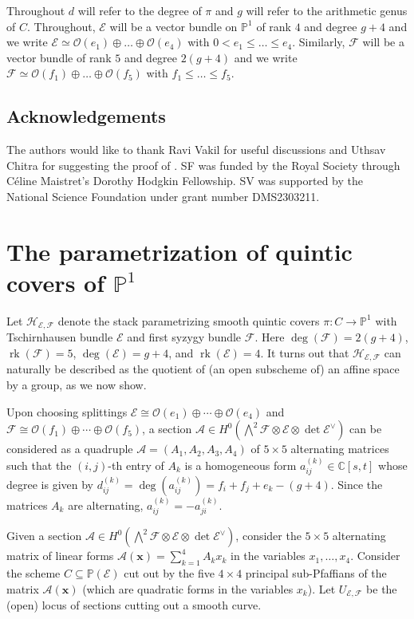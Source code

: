 \documentclass[11pt]{amsart}
\numberwithin{theorem}{section}
\numberwithin{equation}{section}
\theoremstyle{definition}\newtheorem{defn}[theorem]{Definition}
\theoremstyle{definition}\newtheorem{remark}[theorem]{Remark}
\theoremstyle{definition}\newtheorem{question}[theorem]{Question}
\theoremstyle{definition}\newtheorem{problem}[theorem]{Problem}
\newcommand{\CC}{\mathbb{C}}
\newcommand{\PP}{\mathbb{P}}
\newcommand{\cE}{\mathcal{E}}
\newcommand{\cF}{\mathcal{F}}
\newcommand{\cA}{\mathcal{A}}
\newcommand{\cO}{\mathcal{O}}
\newcommand{\cH}{\mathcal{H}}
\DeclareMathOperator{\rank}{rk}
\renewcommand{\subset}{\subseteq}
\begin{document}
Throughout $d$ will refer to the degree of $\pi$ and $g$ will refer to the arithmetic genus of $C$.  Throughout, $\cE$ will be a vector bundle on $\PP^1$ of rank $4$ and degree $g+4$ and we write $\cE \simeq \cO(e_1) \oplus \dots \oplus \cO(e_4)$ with $0 < e_1 \leq \dots \leq e_4$. Similarly, $\cF$ will be a vector bundle of rank $5$ and degree $2(g+4)$ and we write $\cF \simeq \cO(f_1) \oplus \dots \oplus \cO(f_5)$ with $f_1 \leq \dots \leq f_5$.

\subsection{Acknowledgements}
The authors would like to thank Ravi Vakil for useful discussions and Uthsav Chitra for suggesting the proof of . SF was funded by the Royal Society through C{\'e}line Maistret's Dorothy Hodgkin Fellowship. SV was supported by the National Science Foundation under grant number DMS2303211. 

\section{The parametrization of quintic covers of \texorpdfstring{$\PP^1$}{P{\textasciicircum}1}}
\label{sec:param-algebras}
Let $\cH_{\cE, \cF}$ denote the stack parametrizing smooth quintic covers $\pi \colon C \to \PP^1$ with Tschirnhausen bundle $\cE$ and first syzygy bundle $\cF$. Here $\deg(\cF) = 2(g+4)$, $\rank(\cF) = 5$, $\deg(\cE) = g+4$, and $\rank(\cE) = 4$. It turns out that $\cH_{\cE, \cF}$ can naturally be described as the quotient of (an open subscheme of) an affine space by a group, as we now show. 

Upon choosing splittings $\cE \cong \cO(e_1) \oplus \cdots \oplus \cO(e_4)$ and $\cF \cong \cO(f_1) \oplus \cdots \oplus \cO(f_5)$, a section $\cA \in H^0( \bigwedge\nolimits^2 \cF \otimes \cE \otimes \det \cE^{\vee} )$ can be considered as a quadruple $\cA = (A_1, A_2, A_3, A_4)$ of $5 \times 5$ alternating matrices such that the $(i,j)$-th entry of $A_k$ is a homogeneous form $a_{ij}^{(k)} \in \CC[s,t]$ whose degree is given by $d_{ij}^{(k)} = \deg(a_{ij}^{(k)}) = f_i + f_j + e_k - (g+4)$. Since the matrices $A_k$ are alternating, $a_{ij}^{(k)} = -a_{ji}^{(k)}$.

Given a section $\cA \in H^0( \bigwedge\nolimits^2 \cF \otimes \cE \otimes \det \cE^{\vee} )$, consider the $5\times 5$ alternating matrix of linear forms $\cA(\mathbf{x}) = \sum_{k=1}^4 A_k x_k$ in the variables $x_1,\dots,x_4$. Consider the scheme $C \subset \PP(\cE)$ cut out by the five $4 \times 4$ principal sub-Pfaffians of the matrix $\cA(\mathbf{x})$ (which are quadratic forms in the variables $x_k$). Let $U_{\cE,\cF}$ be the (open) locus of sections cutting out a smooth curve. 
\end{document}
